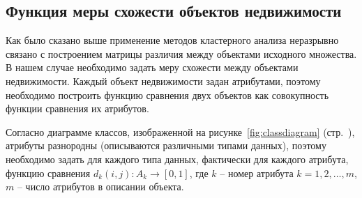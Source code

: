 \documentclass[a4paper,14pt,openany,final]{extreport} %
\begin{document}
\subsection{Функция меры схожести объектов недвижимости}

Как было сказано выше применение методов кластерного анализа неразрывно связано с построением матрицы различия между объектами исходного множества. В нашем случае необходимо задать меру схожести между объектами недвижимости. Каждый объект недвижимости задан атрибутами, поэтому необходимо построить функцию сравнения двух объектов как совокупность функции сравнения их атрибутов.

Согласно диаграмме классов, изображенной на рисунке~\ref{fig:classdiagram} (стр.~\pageref{fig:classdiagram}), атрибуты разнородны (описываются различными типами данных), поэтому необходимо задать для каждого типа данных, фактически для каждого атрибута, функцию сравнения $d_k(i,j):A_k\to [0,1]$, где $k$ -- номер атрибута $k=1,2,\ldots,m$, $m$ -- число атрибутов в описании объекта.
\end{document}
